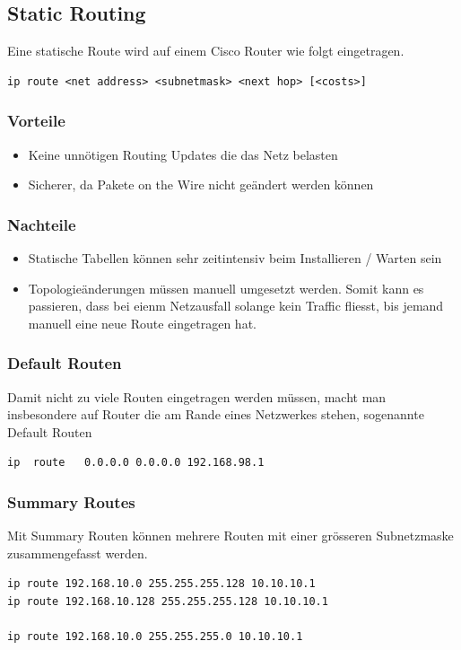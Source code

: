 \subsection{Static Routing}
Eine statische Route wird auf einem Cisco Router wie folgt eingetragen.
\begin{lstlisting}
ip route <net address> <subnetmask> <next hop> [<costs>]\end{lstlisting}	
\subsubsection{Vorteile}
\begin{itemize}
	\item Keine unnötigen Routing Updates die das Netz belasten
	\item Sicherer, da Pakete on the Wire nicht geändert werden können
\end{itemize}

\subsubsection{Nachteile}
\begin{itemize}
	\item Statische Tabellen können sehr zeitintensiv beim Installieren / Warten sein
	\item Topologieänderungen müssen manuell umgesetzt werden. Somit kann es passieren, dass bei eienm Netzausfall solange kein Traffic fliesst, bis jemand manuell eine neue Route eingetragen hat.
\end{itemize}

\subsubsection{Default Routen}
Damit nicht zu viele Routen eingetragen werden müssen, macht man insbesondere auf Router die am Rande eines Netzwerkes stehen, sogenannte Default Routen 
\begin{lstlisting}
ip	route	0.0.0.0	0.0.0.0	192.168.98.1 \end{lstlisting}	

\subsubsection{Summary Routes}
Mit Summary Routen können mehrere Routen mit einer grösseren Subnetzmaske zusammengefasst werden.
\begin{lstlisting}
ip route 192.168.10.0 255.255.255.128 10.10.10.1
ip route 192.168.10.128 255.255.255.128 10.10.10.1

ip route 192.168.10.0 255.255.255.0 10.10.10.1
\end{lstlisting}

